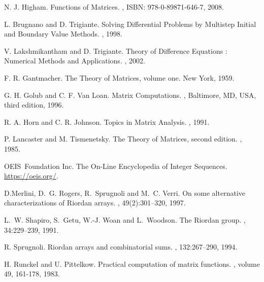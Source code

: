 



\begin{thebibliography}{10}

N. J. Higham.
\newblock Functions of Matrices.
, ISBN: 978-0-89871-646-7, 2008.

L. Brugnano and D. Trigiante.
\newblock Solving Differential Problems by Multistep Initial and Boundary Value Methods.
, 1998.

V. Lakshmikantham and D. Trigiante.
\newblock Theory of Difference Equations : Numerical Methods and Applications.
, 2002.

F. R. Gantmacher.
\newblock The Theory of Matrices, volume one.
\newblock New York, 1959.

G. H. Golub and C. F. Van Loan.
\newblock Matrix Computations.
,
    Baltimore, MD, USA, third edition, 1996.

R. A. Horn and C. R. Johnson.
\newblock Topics in Matrix Analysis.
, 1991.

P. Lancaster and M. Tismenetsky.
\newblock The Theory of Matrices, second edition.
, 1985.


OEIS~Foundation Inc.
\newblock The On-Line {E}ncyclopedia of {I}nteger {S}equences.
\newblock \url{https://oeis.org/}.

D.Merlini, D.~G. Rogers, R.~Sprugnoli and M.~C. Verri.
\newblock On some alternative characterizations of {R}iordan arrays.
, 49(2):301--320, 1997.

L.~W. Shapiro, S.~Getu, W.-J. Woan and L.~Woodson.
\newblock The {R}iordan group.
, 34:229--239, 1991.

R. Sprugnoli.
\newblock Riordan arrays and combinatorial sums.
, 132:267--290, 1994.

H. Runckel and U. Pittelkow.
\newblock Practical computation of matrix functions.
, volume 49, 161-178, 1983.


\end{thebibliography}
